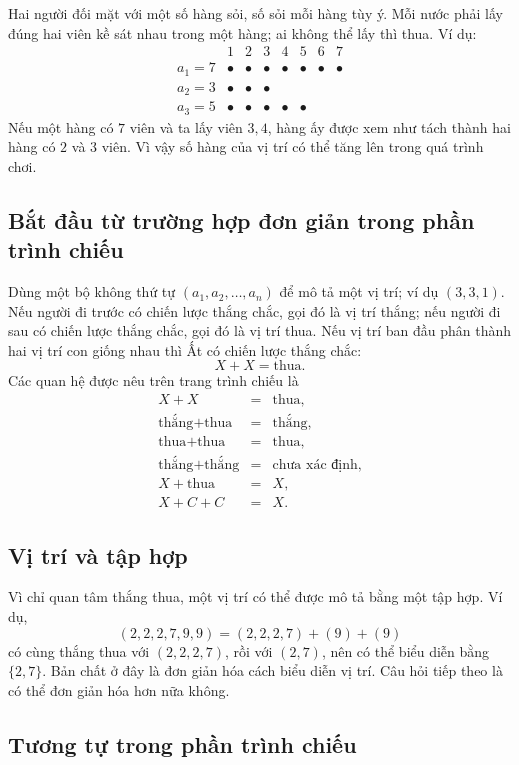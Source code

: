 \documentclass[11pt]{article}
\begin{document}
Hai người đối mặt với một số hàng sỏi, số sỏi mỗi hàng tùy ý. Mỗi nước phải
lấy đúng hai viên kề sát nhau trong một hàng; ai không thể lấy thì thua. Ví
dụ:
\[
\begin{array}{c|ccccccc}
&1&2&3&4&5&6&7\\ \hline
a_1=7&\bullet&\bullet&\bullet&\bullet&\bullet&\bullet&\bullet\\
a_2=3&\bullet&\bullet&\bullet&&&&\\
a_3=5&\bullet&\bullet&\bullet&\bullet&\bullet&&
\end{array}
\]
Nếu một hàng có \(7\) viên và ta lấy viên \(3,4\), hàng ấy được xem như tách
thành hai hàng có \(2\) và \(3\) viên. Vì vậy số hàng của vị trí có thể tăng
lên trong quá trình chơi.

\subsection{Bắt đầu từ trường hợp đơn giản trong phần trình chiếu}

Dùng một bộ không thứ tự \((a_1,a_2,\ldots,a_n)\) để mô tả một vị trí; ví dụ
\((3,3,1)\). Nếu người đi trước có chiến lược thắng chắc, gọi đó là vị trí
thắng; nếu người đi sau có chiến lược thắng chắc, gọi đó là vị trí thua. Nếu
vị trí ban đầu phân thành hai vị trí con giống nhau thì Ất có chiến lược
thắng chắc:
\[
  X+X=\text{thua}.
\]
Các quan hệ được nêu trên trang trình chiếu là
\[
\begin{array}{rcl}
X+X&=&\text{thua},\\
\text{thắng}+\text{thua}&=&\text{thắng},\\
\text{thua}+\text{thua}&=&\text{thua},\\
\text{thắng}+\text{thắng}&=&\text{chưa xác định},\\
X+\text{thua}&=&X,\\
X+C+C&=&X.
\end{array}
\]

\subsection{Vị trí và tập hợp}

Vì chỉ quan tâm thắng thua, một vị trí có thể được mô tả bằng một tập hợp.
Ví dụ,
\[
  (2,2,2,7,9,9)=(2,2,2,7)+(9)+(9)
\]
có cùng thắng thua với \((2,2,2,7)\), rồi với \((2,7)\), nên có thể biểu
diễn bằng \(\{2,7\}\). Bản chất ở đây là đơn giản hóa cách biểu diễn vị trí.
Câu hỏi tiếp theo là có thể đơn giản hóa hơn nữa không.

\subsection{Tương tự trong phần trình chiếu}
\end{document}
